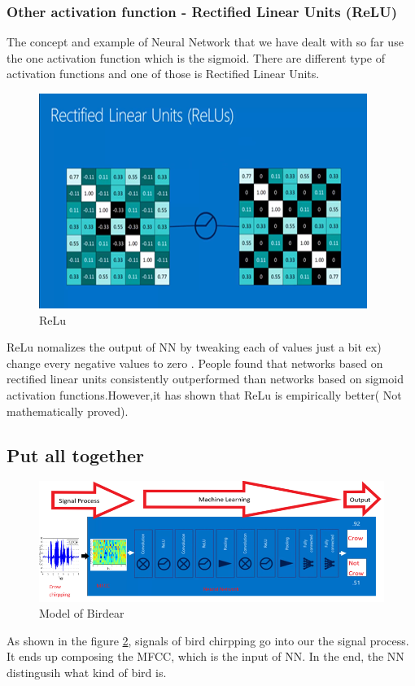 \documentclass{article}
\begin{document}
\subsubsection{Other activation function - Rectified Linear Units (ReLU)}
The concept and example of Neural Network that we have dealt with so far use the one activation function which is the sigmoid. There are different type of activation functions and one of those is Rectified Linear Units.
\begin{figure}[H]
\includegraphics[scale=0.8]{img/relu.png}
\caption{ReLu \protect\cite{CON}}
\label{rele}
\end{figure}
\hfill \break ReLu nomalizes the output of NN by tweaking each of values just a bit ex) change every negative values to zero \cite{DL}.
People found that networks based on rectified linear units consistently outperformed than networks based on sigmoid activation functions.However,it has shown that ReLu is empirically better( Not mathematically proved).

\subsection{Put all together}

\begin{figure}[H]
\includegraphics[scale=0.7]{img/all.png}
\caption{Model of Birdear}
\label{mod}
\end{figure}
As shown in the figure \ref{mod}, signals of bird chirpping go into our the signal process. It ends up composing the MFCC, which is the input of NN. In the end, the NN distingusih what kind of bird is.
\end{document}
